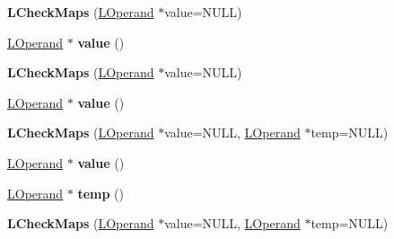 \begin{DoxyCompactItemize}
\item 
{\bfseries L\+Check\+Maps} (\hyperlink{classv8_1_1internal_1_1_l_operand}{L\+Operand} $\ast$value=N\+U\+LL)\hypertarget{classv8_1_1internal_1_1_l_check_maps_a295bd750be5836ee2b03ec4c56192d16}{}\label{classv8_1_1internal_1_1_l_check_maps_a295bd750be5836ee2b03ec4c56192d16}

\item 
\hyperlink{classv8_1_1internal_1_1_l_operand}{L\+Operand} $\ast$ {\bfseries value} ()\hypertarget{classv8_1_1internal_1_1_l_check_maps_a0ce50e2f6650671c56bebe236ebc24cf}{}\label{classv8_1_1internal_1_1_l_check_maps_a0ce50e2f6650671c56bebe236ebc24cf}

\item 
{\bfseries L\+Check\+Maps} (\hyperlink{classv8_1_1internal_1_1_l_operand}{L\+Operand} $\ast$value=N\+U\+LL)\hypertarget{classv8_1_1internal_1_1_l_check_maps_a295bd750be5836ee2b03ec4c56192d16}{}\label{classv8_1_1internal_1_1_l_check_maps_a295bd750be5836ee2b03ec4c56192d16}

\item 
\hyperlink{classv8_1_1internal_1_1_l_operand}{L\+Operand} $\ast$ {\bfseries value} ()\hypertarget{classv8_1_1internal_1_1_l_check_maps_a0ce50e2f6650671c56bebe236ebc24cf}{}\label{classv8_1_1internal_1_1_l_check_maps_a0ce50e2f6650671c56bebe236ebc24cf}

\item 
{\bfseries L\+Check\+Maps} (\hyperlink{classv8_1_1internal_1_1_l_operand}{L\+Operand} $\ast$value=N\+U\+LL, \hyperlink{classv8_1_1internal_1_1_l_operand}{L\+Operand} $\ast$temp=N\+U\+LL)\hypertarget{classv8_1_1internal_1_1_l_check_maps_a3d24cf0ba115948486729e6624265cb3}{}\label{classv8_1_1internal_1_1_l_check_maps_a3d24cf0ba115948486729e6624265cb3}

\item 
\hyperlink{classv8_1_1internal_1_1_l_operand}{L\+Operand} $\ast$ {\bfseries value} ()\hypertarget{classv8_1_1internal_1_1_l_check_maps_a0ce50e2f6650671c56bebe236ebc24cf}{}\label{classv8_1_1internal_1_1_l_check_maps_a0ce50e2f6650671c56bebe236ebc24cf}

\item 
\hyperlink{classv8_1_1internal_1_1_l_operand}{L\+Operand} $\ast$ {\bfseries temp} ()\hypertarget{classv8_1_1internal_1_1_l_check_maps_a92f3028bc206c320b88c7f8116a82904}{}\label{classv8_1_1internal_1_1_l_check_maps_a92f3028bc206c320b88c7f8116a82904}

\item 
{\bfseries L\+Check\+Maps} (\hyperlink{classv8_1_1internal_1_1_l_operand}{L\+Operand} $\ast$value=N\+U\+LL, \hyperlink{classv8_1_1internal_1_1_l_operand}{L\+Operand} $\ast$temp=N\+U\+LL)\hypertarget{classv8_1_1internal_1_1_l_check_maps_a3d24cf0ba115948486729e6624265cb3}{}\label{classv8_1_1internal_1_1_l_check_maps_a3d24cf0ba115948486729e6624265cb3}


\end{DoxyCompactItemize}

